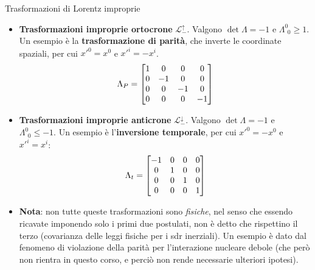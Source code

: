 \documentclass[a4_2,grid,frame]{flashcards}
\newenvironment{cartaflash}
    {\vspace{-15pt}
    \begin{itemize}
    }
    {
    \end{itemize}
    }
\begin{document}
\begin{flashcard}[Proprietà]{Trasformazioni di Lorentz improprie}
\begin{cartaflash}
\item \textbf{Trasformazioni improprie ortocrone} $\mathcal{L}_-^\uparrow$. Valgono $\operatorname{det}\Lambda = -1$ e $\Lambda_{\>\>0}^0 \geq 1$. Un esempio è la \textbf{trasformazione di parità}, che inverte le coordinate spaziali, per cui $x'^0 = x^0$ e $x'^i = -x^i$.
\vspace{-7pt}
\[
\Lambda_P = \begin{bmatrix}
1 & 0 & 0 & 0\\
0 & -1 & 0 & 0\\
0 & 0 & -1 & 0\\
0 & 0 & 0 & -1
\end{bmatrix}
\vspace{-7pt}
\]
\item \textbf{Trasformazioni improprie anticrone} $\mathcal{L}_-^\downarrow$. Valgono $\operatorname{det}\Lambda = -1$ e $\Lambda_{\>\>0}^0 \leq -1$. Un esempio è l'\textbf{inversione temporale}, per cui $x'^0 = -x^0$ e $x'^i = x^i$:
\vspace{-7pt}
\[
\Lambda_t = \begin{bmatrix}
-1 & 0 & 0 & 0\\
0 & 1 & 0 & 0\\
0 & 0 & 1 & 0\\
0 & 0 & 0 & 1
\end{bmatrix}
\vspace{-12pt}
\]
\item \textbf{Nota}: non tutte queste trasformazioni sono \textit{fisiche}, nel senso che essendo ricavate imponendo solo i primi due postulati, non è detto che rispettino il terzo (covarianza delle leggi fisiche per i sdr inerziali). Un esempio è dato dal fenomeno di violazione della parità per l'interazione nucleare debole (che però non rientra in questo corso, e perciò non rende necessarie ulteriori ipotesi).
\end{cartaflash}
\end{flashcard}
\end{document}
